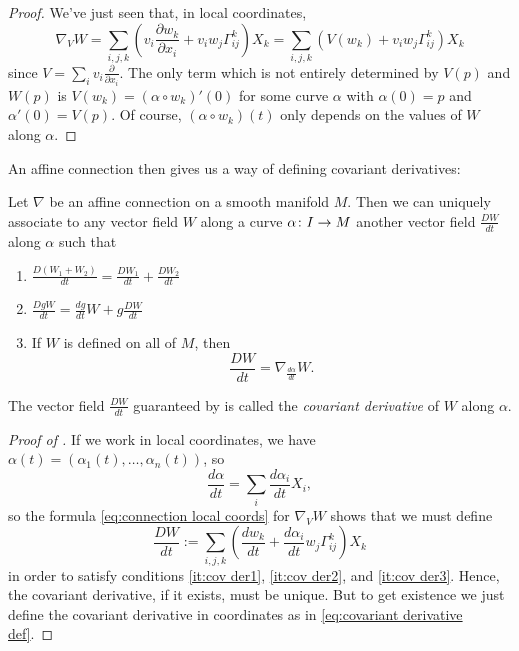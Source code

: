 \begin{proof}
	We've just seen that, in local coordinates,
	\begin{equation}\label{eq:connection local coords}
		\nabla_V W = \sum_{i,j,k} \left( v_i \frac{\partial w_k}{\partial x_i} + v_i w_j \Gamma_{ij}^k \right)X_k = \sum_{i,j,k} \left( V(w_k) + v_i w_j \Gamma_{ij}^k \right)X_k
	\end{equation}
	since $V = \sum_i v_i \frac{\partial }{\partial x_i}$. The only term which is not entirely determined by $V(p)$ and $W(p)$ is $V(w_k) = (\alpha \circ w_k)'(0)$ for some curve $\alpha$ with $\alpha(0) = p$ and $\alpha'(0) = V(p)$. Of course, $(\alpha \circ w_k)(t)$ only depends on the values of $W$ along $\alpha$.
\end{proof}

An affine connection then gives us a way of defining covariant derivatives:

\begin{proposition}\label{prop:covariant derivative}
	Let $\nabla$ be an affine connection on a smooth manifold $M$. Then we can uniquely associate to any vector field $W$ along a curve $\alpha \colon\thinspace\! I \to M$ another vector field $\frac{DW}{dt}$ along $\alpha$ such that
	\begin{enumerate}
		\item \label{it:cov der1} $\frac{D(W_1 + W_2)}{dt} = \frac{DW_1}{dt} + \frac{DW_2}{dt}$
		\item \label{it:cov der2} $\frac{DgW}{dt} = \frac{dg}{dt} W + g \frac{DW}{dt}$
		\item \label{it:cov der3} If $W$ is defined on all of $M$, then
		\[
			\frac{DW}{dt} = \nabla_{\frac{d\alpha}{dt}} W.
		\]
	\end{enumerate}
\end{proposition}

\begin{definition}\label{def:covariant derivative}
	The vector field $\frac{DW}{dt}$ guaranteed by  is called the \emph{covariant derivative} of $W$ along $\alpha$.
\end{definition}

\begin{proof}[Proof of ]
	If we work in local coordinates, we have $\alpha(t) = (\alpha_1(t), \dots , \alpha_n(t))$, so
	\[
		\frac{d\alpha}{dt} = \sum_i \frac{d\alpha_i}{dt} X_i,
	\]
	so the formula \eqref{eq:connection local coords} for $\nabla_VW$ shows that we must define
	\begin{equation}\label{eq:covariant derivative def}
		\frac{DW}{dt} := \sum_{i,j,k} \left( \frac{dw_k}{dt} + \frac{d\alpha_i}{dt} w_j \Gamma_{ij}^k \right)X_k
	\end{equation}
	in order to satisfy conditions \ref{it:cov der1}, \ref{it:cov der2}, and \ref{it:cov der3}. Hence, the covariant derivative, if it exists, must  be unique. But to get existence we just define the covariant derivative in coordinates as in \eqref{eq:covariant derivative def}.
\end{proof}

